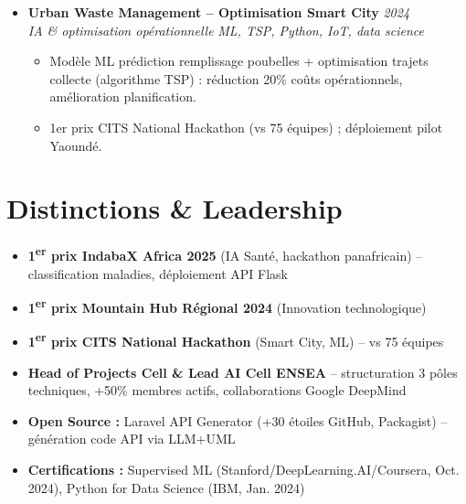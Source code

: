 \documentclass[a4paper,11pt]{article}
\begin{document}
\begin{itemize}[leftmargin=*, label={-}]
    \item \textbf{Urban Waste Management -- Optimisation Smart City} \hfill \textit{2024} \\
    \textit{IA \& optimisation opérationnelle} \hfill \textit{ML, TSP, Python, IoT, data science}
    \vspace{-2pt}
    \begin{itemize}[leftmargin=0.4cm, nosep, label=\tiny$\bullet$]
        \item \small{Mod\`ele ML prédiction remplissage poubelles + optimisation trajets collecte (algorithme TSP) : réduction 20\% coûts opérationnels, amélioration planification.}
        \item \small{1er prix CITS National Hackathon (vs 75 équipes) ; déploiement pilot Yaoundé.}
    \end{itemize}
    \vspace{3pt}

\end{itemize}

\section{Distinctions \& Leadership}
\begin{itemize}[leftmargin=*, label=\tiny$\bullet$, nosep]
    \item \small{\textbf{1\textsuperscript{er} prix IndabaX Africa 2025} (IA Santé, hackathon panafricain) -- classification maladies, déploiement API Flask}
    \item \small{\textbf{1\textsuperscript{er} prix Mountain Hub Régional 2024} (Innovation technologique)}
    \item \small{\textbf{1\textsuperscript{er} prix CITS National Hackathon} (Smart City, ML) -- vs 75 équipes}
    \item \small{\textbf{Head of Projects Cell \& Lead AI Cell ENSEA} -- structuration 3 pôles techniques, +50\% membres actifs, collaborations Google DeepMind}
    \item \small{\textbf{Open Source :} Laravel API Generator (+30 étoiles GitHub, Packagist) -- génération code API via LLM+UML}
    \item \small{\textbf{Certifications :} Supervised ML (Stanford/DeepLearning.AI/Coursera, Oct. 2024), Python for Data Science (IBM, Jan. 2024)}
\end{itemize}
\end{document}
